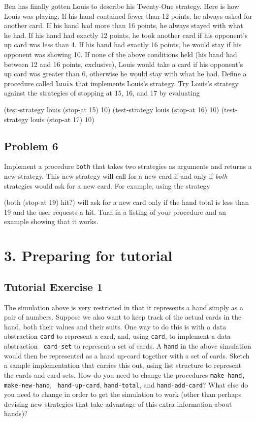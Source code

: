 Ben has finally gotten Louis to describe his Twenty-One strategy.
Here is how Louis was playing.  If his hand contained fewer than 12
points, he always asked for another card.  If his hand had more than
16 points, he always stayed with what he had.  If his hand had exactly
12 points, he took another card if his opponent's up card was less
than 4.  If his hand had exactly 16 points, he would stay if his
opponent was showing 10.  If none of the above conditions held (his
hand had between 12 and 16 points, exclusive), Louis would take a card
if his opponent's up card was greater than 6, otherwise he would stay
with what he had.  Define a procedure called {\tt louis} that
implements Louis's strategy.  Try Louis's strategy against the
strategies of stopping at 15, 16, and 17 by evaluating

\beginlisp
(test-strategy louis (stop-at 15) 10)
(test-strategy louis (stop-at 16) 10)
(test-strategy louis (stop-at 17) 10)
\endlisp

\subsection{Problem 6}

Implement a procedure {\tt both} that takes two strategies as
arguments and returns a new strategy.  This new strategy will call for
a new card if and only if {\em both} strategies would ask for a new
card.  For example, using the strategy

\beginlisp
(both (stop-at 19) hit?)
\endlisp
 will ask for a new card only if the hand total is less than 19 and
the user requests a hit.  Turn in a listing of your procedure and an
example showing that it works.


\section{3. Preparing for tutorial}

\subsection{Tutorial Exercise 1}

The simulation above is very restricted in that it represents a hand
simply as a pair of numbers.  Suppose we also want to keep track of
the actual cards in the hand, both their values and their suits.  One
way to do this is with a data abstraction {\tt card} to represent a
card, and, using {\tt card}, to implement a data abstraction {\tt
card-set} to represent a set of cards.  A {\tt hand} in the above
simulation would then be represented as a hand up-card together with a
set of cards.  Sketch a sample implementation that carries this out,
using list structure to represent the cards and card sets.  How do you
need to change the procedures {\tt make-hand, make-new-hand}, {\tt
hand-up-card}, {\tt hand-total}, and {\tt hand-add-card}?  What else
do you need to change in order to get the simulation to work (other
than perhaps devising new strategies that take advantage of this extra
information about hands)?

